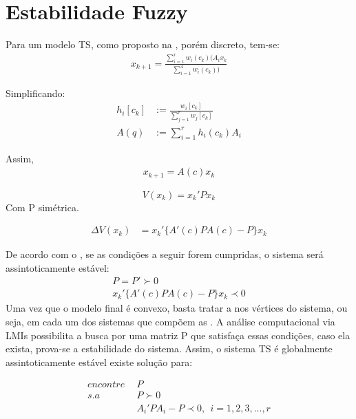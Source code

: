 \section{Estabilidade Fuzzy}
Para um modelo TS, como proposto na , porém discreto, tem-se:
\begin{align*}
	x_{k+1} = \frac{\sum_{i=1}^{r}  w_i(c_k)(A_i x_k}{\sum_{i=1}^{4} w_i(c_k))} 
\end{align*}

Simplificando:
\begin{align*}
	h_i[c_k] &:= \frac{w_i[c_k]}{\sum_{j=1}^{r}w_j[c_k]} \\
	A(q) &:= \sum_{i=1}^{r} h_i(c_k)A_i
\end{align*}

Assim,
\begin{align}
	x_{k+1} = A(c) x_k
\end{align}

\begin{equation}
	V(x_k) = x_k' P x_k
\end{equation}
Com P simétrica.

\begin{align}
	\Delta V(x_k) &= x_k'\{A'(c)PA(c) - P\}x_k
\end{align}

De acordo com o , se as condições a seguir forem cumpridas, o sistema será assintoticamente estável:
\begin{align}
	P = P' \succ 0 \\
	x_k'\{A'(c)PA(c) - P \}x_k \prec 0 \label{eqLyapXk}
\end{align}
Uma vez que o modelo final é convexo, basta tratar a  nos vértices do sistema, ou seja, em cada um dos sistemas que compõem as . 
A análise computacional via LMIs possibilita a busca por uma matriz P que satisfaça essas condições, caso ela exista, prova-se a estabilidade do sistema. Assim, o sistema TS é globalmente assintoticamente estável \cite{tanakaWang} existe solução para:

\begin{align}
	encontre \ \ &P \nonumber \\
	s.a \ \ &P \succ 0 \nonumber \\
	&A_i'PA_i - P \prec 0, \ \ i=1,2,3, ... , r
\end{align}


%

